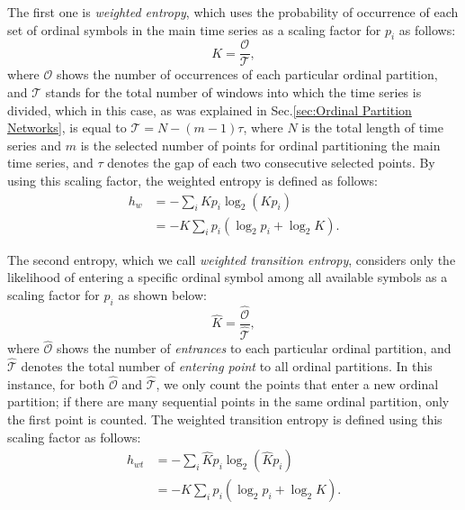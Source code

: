 \documentclass[%
 aip,
 amsmath,amssymb,
 reprint,%
]{revtex4-1}
\begin{document}
The first one is \textit{weighted entropy}, which uses the probability of occurrence of each set of ordinal symbols in the main time series as a scaling factor for $p_i$ as follows:
\begin{equation}
K = \frac{\mathcal{O}}{\mathcal{T}},
\label{eq.4_1} 
\end{equation}
where $\mathcal{O}$ shows the number of occurrences of each particular ordinal partition, and $\mathcal{T}$ stands for the total number of windows into which the time series is divided, which in this case, as was explained in Sec.\ref{sec:Ordinal Partition Networks}, is equal to $\mathcal{T} = N-(m-1)\tau$, where $N$ is the total length of time series and $m$ is the selected number of points for ordinal partitioning the main time series, and $\tau$ denotes the gap of each two consecutive selected points. By using this scaling factor, the weighted entropy is defined as follows:
\begin{equation}
\begin{split}
h_w & = -\sum_{i} K p_i \log_2 (K p_i) \\
 & = -K\sum_{i} p_i (\log_2 p_i + \log_2 K).
\end{split}
\label{eq.4} 
\end{equation}

The second entropy, which we call \textit{weighted transition entropy}, considers only the likelihood of entering a specific ordinal symbol among all available symbols as a scaling factor for $p_i$ as shown below:
\begin{equation}
\hat{K} = \frac{\hat{\mathcal{O}}}{\hat{\mathcal{T}}},
\label{eq.5_1} 
\end{equation}
where $\hat{\mathcal{O}}$ shows the number of \textit{entrances} to each particular ordinal partition, and $\hat{\mathcal{T}}$ denotes the total number of \textit{entering point} to all ordinal partitions. In this instance, for both $\hat{\mathcal{O}}$ and $\hat{\mathcal{T}}$, we only count the points that enter a new ordinal partition; if there are many sequential points in the same ordinal partition, only the first point is counted. The weighted transition entropy is defined using this scaling factor as follows:
\begin{equation}
\begin{split}
h_{wt} & = -\sum_{i} \hat{K} p_i \log_2 (\hat{K} p_i) \\
 & = -\hat{K}\sum_{i} p_i (\log_2 p_i + \log_2 \hat{K}).
\end{split}
\label{eq.5} 
\end{equation}
\end{document}
